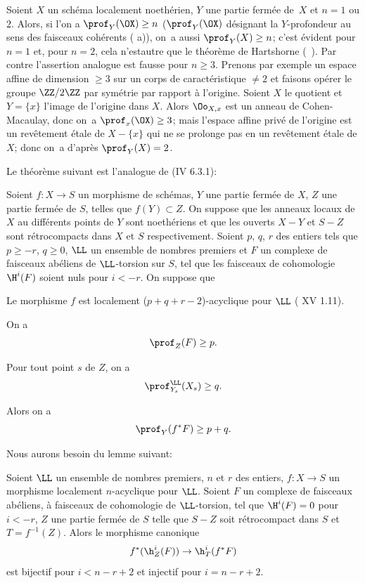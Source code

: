 \begin{exemple} \label{XIV.1.12}
Soient $X$ un sch\'ema localement noeth\'erien, $Y$ une partie ferm\'ee de~$X$ et $n=1$ ou $2$. Alors, si l'on a $\prof_Y(\OX)\geq n$ ($\prof_Y(\OX)$ d\'esignant la $Y$-profondeur au sens des faisceaux coh\'erents ( a)), on~a aussi $\prof_Y(X)\geq n$; c'est \'evident pour $n=1$ et, pour $n=2$, cela n'est\pageoriginale autre que le th\'eor\`eme de Hartshorne (~). Par contre l'assertion analogue est fausse pour $n\geq 3$. Prenons par exemple un espace affine de dimension $\geq 3$ sur un corps de caract\'eristique $\neq 2$ et faisons op\'erer le groupe $\ZZ/2\ZZ$ par sym\'etrie par rapport \`a l'origine. Soient $X$ le quotient et $Y=\{x\}$ l'image de l'origine dans $X$. Alors $\Oo_{X, x}$ est un anneau de Cohen-Macaulay, donc on~a $\prof_x(\OX)\geq 3$; mais l'espace affine priv\'e de l'origine est un rev\^etement \'etale de $X-\{x\}$ qui ne se prolonge pas en un rev\^etement \'etale de $X$; donc on~a d'apr\`es  $\prof_Y(X)=2$.
\end{exemple}

Le th\'eor\`eme suivant est l'analogue de (\EGA IV 6.3.1):

\begin{theoreme} \label{XIV.1.13}
Soient $f:X\to S$ un morphisme de sch\'emas, $Y$ une partie ferm\'ee de $X$, $Z$ une partie ferm\'ee de $S$, telles que $f(Y)\subset Z$. On suppose que les anneaux locaux de $X$ au diff\'erents points de $Y$ sont noeth\'eriens et que les ouverts $X-Y$ et $S-Z$ sont r\'etrocompacts dans $X$ et $S$ respectivement. Soient $p$, $q$, $r$ des entiers tels que $p\geq -r$, $q\geq 0$, $\LL$ un ensemble de nombres premiers et $F$ un complexe de faisceaux ab\'eliens de $\LL$-torsion sur $S$, tel que les faisceaux de cohomologie $\H^i(F)$ soient nuls pour $i<-r$. On suppose que
\begin{enumeratea}
\item
Le morphisme $f$ est localement ($p+q+r-2$)-acyclique pour $\LL$ \textup{( XV 1.11)}.
\item
On a
$$
\prof_Z(F)\geq p.
$$
\item
Pour tout point $s$ de $Z$, on a
$$
\prof_{Y_s}^{\LL}(X_s)\geq q.
$$
\end{enumeratea}
\noindent
Alors on a\pageoriginale
$$
\prof_Y(f^*F)\geq p+q.
$$
\end{theoreme}

Nous aurons besoin du lemme suivant:

\begin{sublemme} \label{XIV.1.13.1}
Soient $\LL$ un ensemble de nombres premiers, $n$ et $r$ des entiers, $f:X\to S$ un morphisme localement $n$-acyclique pour $\LL$. Soient $F$ un complexe de faisceaux ab\'eliens, \`a faisceaux de cohomologie de $\LL$-torsion, tel que $\H^i(F)=0$ pour $i<-r$, $Z$ une partie ferm\'ee de $S$ telle que $S-Z$ soit r\'etrocompact dans $S$ et $T=f^{-1}(Z)$. Alors le morphisme canonique
$$f^*({\h}_Z^i(F))\to {\h}_T^i(f^*F)$$
est bijectif pour $i<n-r+2$ et injectif pour $i=n-r+2$.
\end{sublemme}

